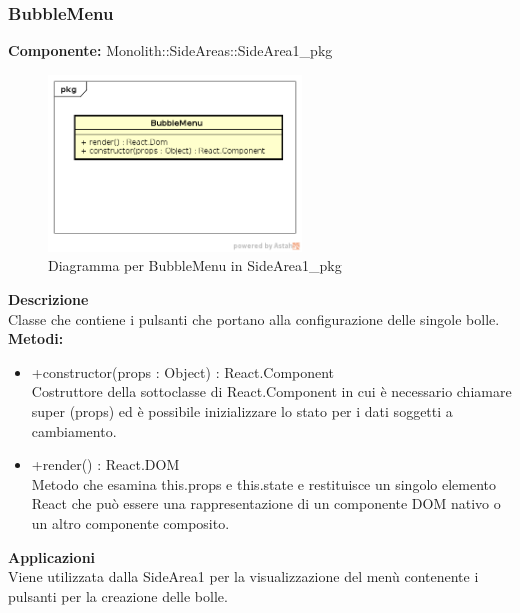 \clearpage

\subsubsection{BubbleMenu}
\textbf{Componente:}  Monolith::SideAreas::SideArea1\_pkg\\
   \FloatBarrier
   \begin{figure}[ht]
   \centering
   \includegraphics[width=0.6\textwidth]{img/single-BubbleMenu.png}
   \caption{{Diagramma per BubbleMenu in SideArea1\_pkg}}
\end{figure}
\FloatBarrier
\textbf{Descrizione}\\
Classe che contiene i pulsanti che portano alla configurazione delle singole bolle.
\textbf{Metodi:} 
\begin{itemize}
\item +constructor(props : Object) : React.Component 
\\
Costruttore della sottoclasse di React.Component in cui è necessario chiamare super (props) ed è possibile inizializzare lo stato per i dati soggetti a cambiamento.
\item +render() : React.DOM 
\\
Metodo che esamina this.props e this.state e restituisce un singolo elemento React che può essere una rappresentazione di un componente DOM nativo o un altro componente composito.
\end{itemize} 


\textbf{Applicazioni}\\
Viene utilizzata dalla SideArea1 per la visualizzazione del menù contenente i pulsanti per la creazione delle bolle. 


\clearpage

